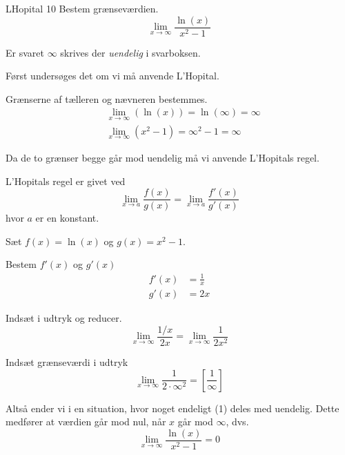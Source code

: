 \documentclass{article}
\begin{document}
\begin{exercise}{LHopital 10}
Bestem grænseværdien.
\[
\lim_{x \to \infty} \frac{\ln(x)}{x^2-1}
\] 

Er svaret $\infty$ skrives der \emph{uendelig} i svarboksen.


\hint
Først undersøges det om vi må anvende L'Hopital.

\hint
Grænserne af tælleren og nævneren bestemmes.
\begin{align*}
	&\lim_{x \to \infty} (\ln(x)) = \ln(\infty) = \infty \\
	&\lim_{x \to \infty} (x^2 - 1) = \infty^2 - 1 = \infty
\end{align*}

\hint
Da de to grænser begge går mod uendelig må vi  anvende L'Hopitals regel. 

\hint
L'Hopitals regel er givet ved
\[
\lim_{x \to a} \frac{f(x)}{g(x)} = \lim_{x \to a} \frac{f'(x)}{g'(x)} 
\]
hvor $a$  er en konstant.

\hint
Sæt $f(x) = \ln(x)$ og $g(x) = x^2-1$. 

\hint
Bestem $f'(x)$ og $g'(x)$
\begin{align*}
	f'(x) &= \frac{1}{x} \\
	g'(x) &= 2x
\end{align*}

\hint
Indsæt i udtryk og reducer. 
\[
\lim_{x \to \infty} \frac{1/x}{2x} = \lim_{x \to \infty} \frac{1}{2x^2} 
\]

\hint
Indsæt grænseværdi i udtryk
\[
\lim_{x \to \infty} \frac{1}{2 \cdot \infty^2}  = \left[ \frac{1}{\infty}  \right] 
\]

\hint
Altså ender vi i en situation, hvor noget endeligt (1) deles med uendelig. Dette medfører at værdien går mod nul, når $x$ går mod $\infty$, dvs.
\[
\lim_{x \to \infty} \frac{\ln(x)}{x^2 - 1} = 0
\]


\end{exercise}
\end{document}
